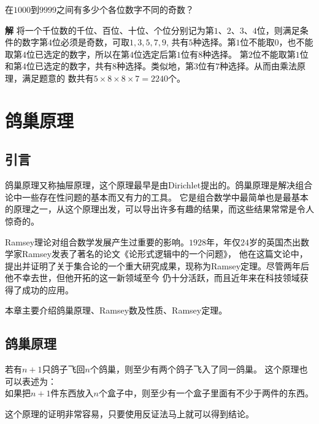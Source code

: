 \begin{exa}
在$1000$到$9999$之间有多少个各位数字不同的奇数？
\end{exa}
\textbf{解}
将一个千位数的千位、百位、十位、个位分别记为第$1$、$2$、$3$、$4$位，则满足条件的数字第$4$位必须是奇数，可取$1,3,5,7,9$,
共有$5$种选择。第$1$位不能取$0$，也不能取第$4$位已选定的数字，所以在第$4$位选定后第$1$位有$8$种选择。
第$2$位不能取第$1$位和第$4$位已选定的数字，共有$8$种选择。类似地，第$3$位有$7$种选择。从而由乘法原理，满足题意的
数共有$5\times 8\times 8\times 7=2240$个。

\section{鸽巢原理}
\subsection{引言}

鸽巢原理又称抽屉原理，这个原理最早是由Dirichlet提出的。鸽巢原理是解决组合论中一些存在性问题的基本而又有力的工具。
它是组合数学中最简单也是最基本的原理之一，从这个原理出发，可以导出许多有趣的结果，而这些结果常常是令人惊奇的。

Ramsey理论对组合数学发展产生过重要的影响。$1928$年，年仅$24$岁的英国杰出数学家Ramsey发表了著名的论文《论形式逻辑中的一个问题》，
他在这篇文论中，提出并证明了关于集合论的一个重大研究成果，现称为Ramsey定理。尽管两年后他不幸去世，但他开拓的这一新领域至今
仍十分活跃，而且近年来在科技领域获得了成功的应用。

本章主要介绍鸽巢原理、Ramsey数及性质、Ramsey定理。
\subsection{鸽巢原理}
\begin{thm}
若有$n+1$只鸽子飞回$n$个鸽巢，则至少有两个鸽子飞入了同一鸽巢。
这个原理也可以表述为：\\如果把$n+1$件东西放入$n$个盒子中，则至少有一个盒子里面有不少于两件的东西。
\end{thm}
这个原理的证明非常容易，只要使用反证法马上就可以得到结论。

